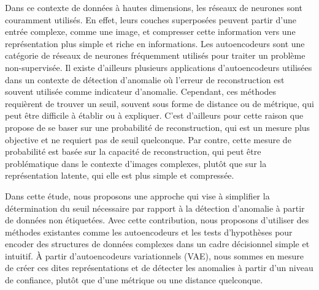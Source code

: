 Dans ce contexte de données à hautes dimensions, les réseaux de neurones sont couramment utilisés. En effet, leurs couches superposées peuvent partir d'une entrée complexe, comme une image, et compresser cette information vers une représentation plus simple et riche en informations. Les autoencodeurs sont une catégorie de réseaux de neurones fréquemment utilisés pour traiter un problème non-supervisée. Il existe d'ailleurs plusieurs applications d'autoencodeurs utilisées dans un contexte de détection d'anomalie où l'erreur de reconstruction est souvent utilisée comme indicateur d'anomalie. Cependant, ces méthodes requièrent de trouver un seuil, souvent sous forme de distance ou de métrique, qui peut être difficile à établir ou à expliquer. C'est d'ailleurs pour cette raison que  \cite{An2015VariationalAB} propose de se baser sur une probabilité de reconstruction, qui est un mesure plus objective et ne requiert pas de seuil quelconque. Par contre, cette mesure de probabilité est basée sur la capacité de reconstruction, qui peut être problématique dans le contexte d'images complexes, plutôt que sur la représentation latente, qui elle est plus simple et compressée. \newline

Dans cette étude, nous proposons une approche qui vise à simplifier la détermination du seuil nécessaire par rapport à la détection d'anomalie à partir de données non étiquetées. Avec cette contribution, nous proposons d'utiliser des méthodes existantes comme les autoencodeurs et les tests d'hypothèses pour encoder des structures de données complexes dans un cadre décisionnel simple et intuitif. À partir d'autoencodeurs variationnels (VAE), nous sommes en mesure de créer ces dites représentations et de détecter les anomalies à partir d'un niveau de confiance, plutôt que d'une métrique ou une distance quelconque.